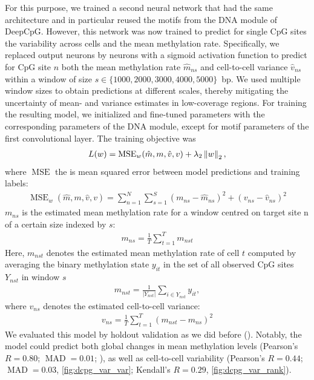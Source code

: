For this purpose, we trained a second neural network that had the same architecture and in particular reused the motifs from the DNA module of DeepCpG. However, this network was now trained to predict for single CpG sites the variability across cells and the mean methylation rate. Specifically, we replaced output neurons by neurons with a sigmoid activation function to predict for CpG site $n$ both the mean methylation rate $\hat{m}_{ns}$ and cell-to-cell variance $\hat{v}_{ns}$ within a window of size $s\in\{1000,2000,3000,4000,5000\}$~bp. We used multiple window sizes to obtain predictions at different scales, thereby mitigating the uncertainty of mean- and variance estimates in low-coverage regions. For training the resulting model, we initialized and fine-tuned parameters with the corresponding parameters of the DNA module, except for motif parameters of the first convolutional layer. The training objective was
\newcommand{\Xmse}{\operatorname{MSE}}
\begin{align}
  L(w)=\Xmse_w (\hat{m},m,\hat{v},v)+\lambda_2 \norm{w}_2,
\end{align}
where $\Xmse$ the is mean squared error between model predictions and training labels:
\begin{align}
  \Xmse_w(\hat{m},m,\hat{v},v)=\sum_{n=1}^{N}\sum_{s=1}^S (m_{ns}-\hat{m}_{ns})^2+(v_{ns}-\hat{v}_{ns})^2
\end{align}
$m_{ns}$ is the estimated mean methylation rate for a window centred on target site n of a certain size indexed by $s$:
\begin{align}
  m_{ns}=\frac{1}{T}\sum_{t=1}^T m_{nst}
\end{align}
Here, $m_{nst}$ denotes the estimated mean methylation rate of cell $t$ computed by averaging the binary methylation state $y_{it}$ in the set of all observed CpG sites $Y_{nst}$ in window $s$
\begin{align}
  m_{nst}=\frac{1}{|Y_{nst}|} \sum_{i \in Y_{nst}} y_{it},
\end{align}
where $v_{ns}$ denotes the estimated cell-to-cell variance:
\begin{align}
  v_{ns}=\frac{1}{T} \sum_{t=1}^T (m_{nst}-m_{ns})^2
\end{align}
We evaluated this model by holdout validation as we did before (). Notably, the model could predict both global changes in mean methylation levels (Pearson's $R=0.80$; $\operatorname{MAD}=0.01$; ), as well as cell-to-cell variability (Pearson's $R=0.44$; $\operatorname{MAD}=0.03$, \cref{fig:dcpg_var_var}; Kendall's $R=0.29$, \cref{fig:dcpg_var_rank}).

